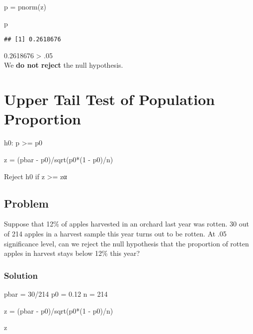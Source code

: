 \documentclass[
]{article}
\newenvironment{Shaded}{\begin{snugshade}}{\end{snugshade}}
\newcommand{\DecValTok}[1]{\textcolor[rgb]{0.00,0.00,0.81}{#1}}
\newcommand{\FloatTok}[1]{\textcolor[rgb]{0.00,0.00,0.81}{#1}}
\newcommand{\FunctionTok}[1]{\textcolor[rgb]{0.00,0.00,0.00}{#1}}
\newcommand{\NormalTok}[1]{#1}
\newcommand{\OtherTok}[1]{\textcolor[rgb]{0.56,0.35,0.01}{#1}}
\newcommand{\SpecialCharTok}[1]{\textcolor[rgb]{0.00,0.00,0.00}{#1}}
\begin{document}
\begin{Shaded}
\begin{Highlighting}[]
\NormalTok{p }\OtherTok{=} \FunctionTok{pnorm}\NormalTok{(z)}

\NormalTok{p}
\end{Highlighting}
\end{Shaded}

\begin{verbatim}
## [1] 0.2618676
\end{verbatim}

0.2618676 \textgreater{} .05\\
We \textbf{do not reject} the null hypothesis.

\hypertarget{upper-tail-test-of-population-proportion}{%
\section{Upper Tail Test of Population
Proportion}\label{upper-tail-test-of-population-proportion}}

h0: p \textgreater= p0

z = (pbar - p0)/sqrt(p0*(1 - p0)/n)

Reject h0 if z \textgreater= zα

\hypertarget{problem-17}{%
\subsection{Problem}\label{problem-17}}

Suppose that 12\% of apples harvested in an orchard last year was
rotten. 30 out of 214 apples in a harvest sample this year turns out to
be rotten. At .05 significance level, can we reject the null hypothesis
that the proportion of rotten apples in harvest stays below 12\% this
year?

\hypertarget{solution-19}{%
\subsubsection{Solution}\label{solution-19}}

\begin{Shaded}
\begin{Highlighting}[]
\NormalTok{pbar }\OtherTok{=} \DecValTok{30}\SpecialCharTok{/}\DecValTok{214}
\NormalTok{p0 }\OtherTok{=} \FloatTok{0.12}
\NormalTok{n }\OtherTok{=} \DecValTok{214}

\NormalTok{z }\OtherTok{=}\NormalTok{ (pbar }\SpecialCharTok{{-}}\NormalTok{ p0)}\SpecialCharTok{/}\FunctionTok{sqrt}\NormalTok{(p0}\SpecialCharTok{*}\NormalTok{(}\DecValTok{1} \SpecialCharTok{{-}}\NormalTok{ p0)}\SpecialCharTok{/}\NormalTok{n)}

\NormalTok{z}
\end{Highlighting}
\end{Shaded}
\end{document}
